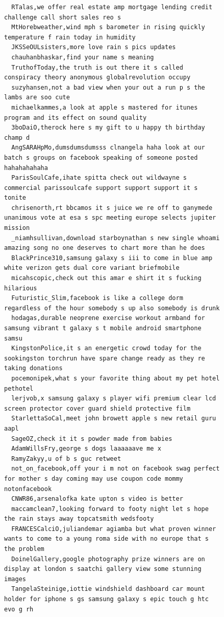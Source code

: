 \begin{figure}[htpb]
\begin{verbatim}
  RTalas,we offer real estate amp mortgage lending credit challenge call short sales reo s
  MtHorebweather,wind mph s barometer in rising quickly temperature f rain today in humidity
  JKSSeOULsisters,more love rain s pics updates
  chauhanbhaskar,find your name s meaning
  TruthofToday,the truth is out there it s called conspiracy theory anonymous globalrevolution occupy
  suzyhansen,not a bad view when your out a run p s the lambs are soo cute
  michaelkammes,a look at apple s mastered for itunes program and its effect on sound quality
  3boDaiO,therock here s my gift to u happy th birthday champ d
  AngSARAHpMo,dumsdumsdumsss clnangela haha look at our batch s groups on facebook speaking of someone posted hahahahahaha
  ParisSoulCafe,ihate spitta check out wildwayne s commercial parissoulcafe support support support it s tonite
  chrisenorth,rt bbcamos it s juice we re off to ganymede unanimous vote at esa s spc meeting europe selects jupiter mission
  _niamhsullivan,download starboynathan s new single whoami amazing song no one deserves to chart more than he does
  BlackPrince310,samsung galaxy s iii to come in blue amp white verizon gets dual core variant briefmobile
  micahscopic,check out this amar e shirt it s fucking hilarious
  Futuristic_Slim,facebook is like a college dorm regardless of the hour somebody s up also somebody is drunk
  hodagas,durable neoprene exercise workout armband for samsung vibrant t galaxy s t mobile android smartphone samsu
  KingstonPolice,it s an energetic crowd today for the sookingston torchrun have spare change ready as they re taking donations
  pocemonipek,what s your favorite thing about my pet hotel pethotel
  lerjvob,x samsung galaxy s player wifi premium clear lcd screen protector cover guard shield protective film
  StarlettaSoCal,meet john browett apple s new retail guru aapl
  SageOZ,check it it s powder made from babies
  AdamWillsFry,george s dogs laaaaaave me x
  RamyZakyy,u of b s guc retweet
  not_on_facebook,off your i m not on facebook swag perfect for mother s day coming may use coupon code mommy notonfacebook
  CNWR86,arsenalofka kate upton s video is better
  maccamclean7,looking forward to footy night let s hope the rain stays away topcatsmith wedsfooty
  FRANCESCalciO,juliandemar agiamba but what proven winner wants to come to a young roma side with no europe that s the problem
  DoinelGallery,google photography prize winners are on display at london s saatchi gallery view some stunning images
  TangelaSteinige,iottie windshield dashboard car mount holder for iphone s gs samsung galaxy s epic touch g htc evo g rh

\end{verbatim}
\end{figure}
